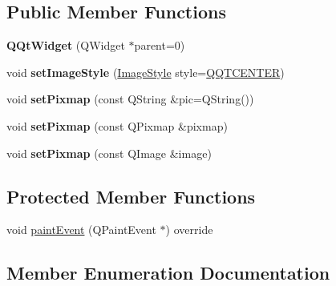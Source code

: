 \subsection*{Public Member Functions}
\begin{DoxyCompactItemize}
\item 
\mbox{\label{class_q_qt_widget_a28805216d8877c09c247cc09cd3aa654}} 
{\bfseries Q\+Qt\+Widget} (Q\+Widget $\ast$parent=0)
\item 
\mbox{\label{class_q_qt_widget_a8a50bdce66c383f4f708d4ea2588f155}} 
void {\bfseries set\+Image\+Style} (\mbox{\hyperlink{class_q_qt_widget_a5a6d58f533c2f43c854f47f71d086cce}{Image\+Style}} style=\mbox{\hyperlink{class_q_qt_widget_a5a6d58f533c2f43c854f47f71d086ccea67fe3a192a16e09bb76e0d6ec23524d7}{Q\+Q\+T\+C\+E\+N\+T\+ER}})
\item 
\mbox{\label{class_q_qt_widget_a7139ad8c4e8cdf6cb17493e8c93f5afb}} 
void {\bfseries set\+Pixmap} (const Q\+String \&pic=Q\+String())
\item 
\mbox{\label{class_q_qt_widget_a9d0b612a44166525f4f1c691a25eab05}} 
void {\bfseries set\+Pixmap} (const Q\+Pixmap \&pixmap)
\item 
\mbox{\label{class_q_qt_widget_a89e4ffac8d1a8cede80746c947c14858}} 
void {\bfseries set\+Pixmap} (const Q\+Image \&image)
\end{DoxyCompactItemize}
\subsection*{Protected Member Functions}
\begin{DoxyCompactItemize}
\item 
void \mbox{\hyperlink{class_q_qt_widget_a6ba32570495e7f880be841557cfea6ea}{paint\+Event}} (Q\+Paint\+Event $\ast$) override
\end{DoxyCompactItemize}


\subsection{Member Enumeration Documentation}
\mbox{\label{class_q_qt_widget_a5a6d58f533c2f43c854f47f71d086cce}} 
